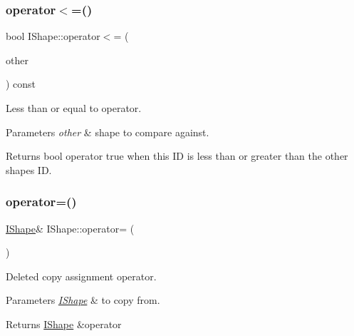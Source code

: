 \subsubsection{\texorpdfstring{operator$<$=()}{operator<=()}}
{\footnotesize\ttfamily bool I\+Shape\+::operator$<$= (\begin{DoxyParamCaption}\item[{const \mbox{\hyperlink{class_i_shape}{I\+Shape}} \&}]{other }\end{DoxyParamCaption}) const}



Less than or equal to operator. 


\begin{DoxyParams}{Parameters}
{\em other} & shape to compare against. \\
\hline
\end{DoxyParams}
\begin{DoxyReturn}{Returns}
bool operator true when this ID is less than or greater than the other shape\textquotesingle{}s ID. 
\end{DoxyReturn}
\mbox{\label{class_i_shape_ab21aa52b87b2544a934ebdf51aba87ff}} 
\subsubsection{\texorpdfstring{operator=()}{operator=()}}
{\footnotesize\ttfamily \mbox{\hyperlink{class_i_shape}{I\+Shape}}\& I\+Shape\+::operator= (\begin{DoxyParamCaption}\item[{const \mbox{\hyperlink{class_i_shape}{I\+Shape}} \&}]{ }\end{DoxyParamCaption})\hspace{0.3cm}{\ttfamily [delete]}}



Deleted copy assignment operator. 


\begin{DoxyParams}{Parameters}
{\em \mbox{\hyperlink{class_i_shape}{I\+Shape}}} & to copy from. \\
\hline
\end{DoxyParams}
\begin{DoxyReturn}{Returns}
\mbox{\hyperlink{class_i_shape}{I\+Shape}} \&operator 
\end{DoxyReturn}
\mbox{\label{class_i_shape_a066b575cba3e0c3f8c6c80fba9ca2734}} 

